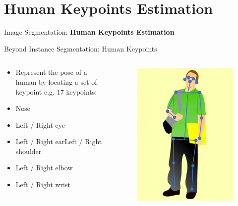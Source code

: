 \section{Human Keypoints Estimation}
\begin{frame}{}
    \LARGE Image Segmentation: \textbf{Human Keypoints Estimation}
\end{frame}

\begin{frame}{Beyond Instance Segmentation: Human Keypoints}
    \begin{columns}
    \begin{column}{0.6\textwidth}
        \begin{itemize}
            \item Represent the pose of a human by locating a set of keypoint
            e.g. 17 keypoints:
            \item Nose
            \item Left / Right eye
            \item Left / Right earLeft / Right shoulder
            \item Left / Right elbow
            \item Left / Right wrist
        \end{itemize}
    \end{column}
    \begin{column}{0.4\textwidth}
        \begin{figure}
        \centering
        \includegraphics[width=1.0\textwidth,height=1.0\textheight,keepaspectratio]{images/segmentation/ins_12.png}

\end{figure}
\end{column}
\end{columns}
\end{frame}
